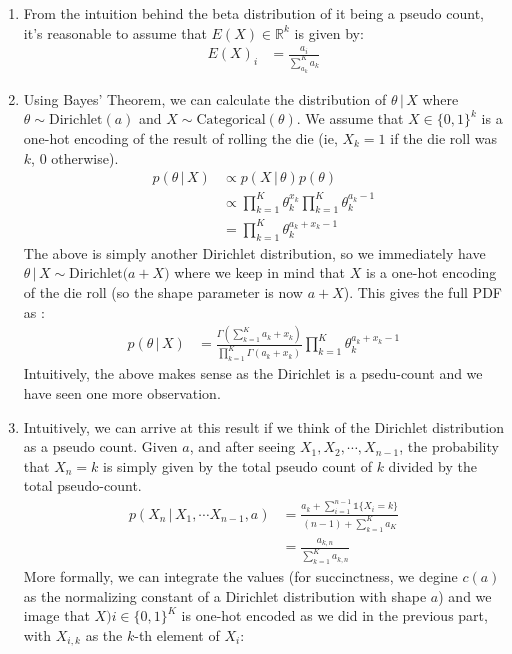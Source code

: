 \documentclass[submit]{harvardml}
\newcommand{\given}{\,|\,}
\theoremstyle{plain}
\begin{document}
\begin{enumerate}[label=(\alph*)]
\item From the intuition behind the beta distribution of it being a pseudo count, it's reasonable to assume that $E(X) \in \mathbb{R}^k$ is given by:
\begin{align*}
E(X)_i &= \frac{a_i}{\sum_{a_k}^K a_k}
\end{align*}
\item Using Bayes' Theorem, we can calculate the distribution of $\theta \given X$ where $\theta \sim \text{Dirichlet}(a)$ and $X \sim \text{Categorical}(\theta)$. We assume that $X \in \{0,1\}^k$ is a one-hot encoding of the result of rolling the die (ie, $X_k = 1$ if the die roll was $k$, $0$ otherwise).
\begin{align*}
p(\theta \given X) &\propto p(X \given \theta)p(\theta) \\
&\propto \prod_{k=1}^K \theta_k^{x_k} \prod_{k=1}^K \theta_k^{a_k-1} \\
&= \prod_{k=1}^K \theta_k^{a_k + x_k - 1}
\end{align*}
The above is simply another Dirichlet distribution, so we immediately have $\theta \given X \sim \text{Dirichlet($a + X$)}$ where we keep in mind that $X$ is a one-hot encoding of the die roll (so the shape parameter is now $a + X$). This gives the full PDF as :
\begin{align*}
p(\theta \given X) &= \frac{\Gamma(\sum_{k=1}^K{a_k+x_k})}{\prod_{k=1}^K \Gamma(a_k + x_k)}\prod_{k=1}^K \theta_k^{a_k + x_k - 1}
\end{align*}
Intuitively, the above makes sense as the Dirichlet is a psedu-count and we have seen one more observation.
\item Intuitively, we can arrive at this result if we think of the Dirichlet distribution as a pseudo count. Given $a$, and after seeing $X_1,X_2, \cdots, X_{n-1}$, the probability that $X_n = k$ is simply given by the total pseudo count of $k$ divided by the total pseudo-count.
\begin{align*}
p(X_n \given X_1, \cdots X_{n-1}, a) &= \frac{a_k + \sum_{i=1}^{n-1}\mathbb{1}\{X_i = k\}}{(n-1) + \sum_{k=1}^K a_K} \\
&= \frac{a_{k,n}}{\sum_{k=1}^K a_{k,n}}
\end{align*}
More formally, we can integrate the values (for succinctness, we degine $c(a)$ as the normalizing constant of a Dirichlet distribution with shape $a$) and we image that $X)i \in \{0,1\}^K$ is one-hot encoded as we did in the previous part, with $X_{i,k}$ as the $k$-th element of $X_i$:

\end{enumerate}
\end{document}
